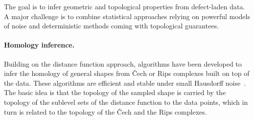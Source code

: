 

The goal is to infer geometric and topological properties from defect-laden data.
 A major challenge is to combine  statistical approaches relying on powerful models of noise and deterministic methods coming with topological guarantees.  



\paragraph{Homology inference.}
Building on the distance function approach, algorithms have been developed to infer the homology of general shapes from \v{C}ech or Rips complexes built on top of the data. 
These algorithms are efficient and stable under small Hausdorff noise~\cite{co-tpr-2008}. The basic idea is that the topology of the sampled shape is carried by the topology of the sublevel sets of the distance function to the data points, which in turn is  related to the topology of the \v{C}ech and the Rips complexes. 

